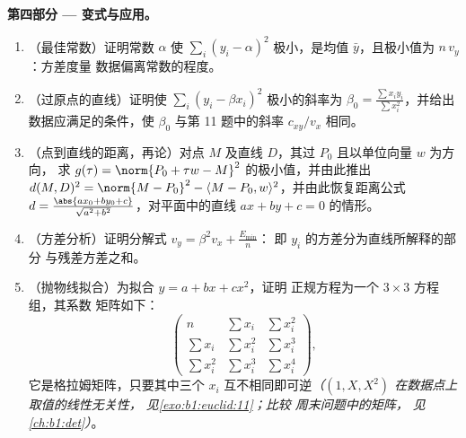 \begin{problem}
\medskip
\noindent\textbf{第四部分 --- 变式与应用。}
\begin{enumerate}[resume]
  \item （最佳常数）证明常数 $\alpha$
        使 $\sum_i (y_i - \alpha)^2$ 极小，是均值 $\bar
        y$，且极小值为 $n\,v_y$：方差度量
        数据偏离常数的程度。
  \item （过原点的直线）证明使
        $\sum_i (y_i - \beta x_i)^2$ 极小的斜率为 $\beta_0 = \frac{\sum
        x_iy_i}{\sum x_i^2}$，并给出数据应满足的条件，使
        $\beta_0$ 与第 11 题中的斜率
        $c_{xy}/v_x$ 相同。
  \item （点到直线的距离，再论）对点 $M$ 及直线
        $D$，其过 $P_0$ 且以单位向量 $w$ 为方向，
        求 $g(\tau) = \norm{P_0 + \tau w - M}^2$ 的极小值，并由此推出
        $d(M, D)^2 = \norm{M - P_0}^2 - \langle M - P_0,
        w\rangle^2$，并由此恢复距离公式 $d = \frac{\abs{a x_0 +
        b y_0 + c}}{\sqrt{a^2 + b^2}}$，对平面中的直线 $ax + by + c
        = 0$ 的情形。
  \item （方差分析）证明分解式 $v_y =
        \beta^2 v_x + \frac{E_{\min}}n$：
        即 $y_i$ 的方差分为直线所解释的部分
        与残差方差之和。
  \item （抛物线拟合）为拟合 $y = a + bx + cx^2$，证明
        正规方程为一个 $3 \times 3$ 方程组，其系数
        矩阵如下：
        \[
        \begin{pmatrix}
        n & \sum x_i & \sum x_i^2\\
        \sum x_i & \sum x_i^2 & \sum x_i^3\\
        \sum x_i^2 & \sum x_i^3 & \sum x_i^4
        \end{pmatrix},
        \]
        它是格拉姆矩阵，只要其中三个
        $x_i$ 互不相同即可逆\emph{（$(1, X, X^2)$ 在数据点上取值的线性无关性，
        见\cref{exo:b1:euclid:11}；比较
        周末问题中的矩阵，
        见\cref{ch:b1:det}）}。
\end{enumerate}


\end{problem}
